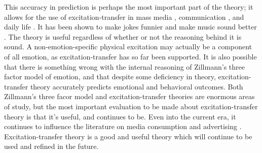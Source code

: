 \documentclass[
  stu,
  12pt]{apa7}
\begin{document}
This accuracy in prediction is perhaps the most important part of the
theory; it allows for the use of excitation-transfer in mass media
\autocite{bryExcitationTransferTheoryThreeFactor,tanEmotionalArousalFacilitation},
communication \autocite{zilEffectResidualExcitation}, and daily life
\autocite{tanEmotionalArousalFacilitation}. It has been shown to make
jokes funnier \autocite{canEnhancementHumorAppreciation} and make music
sound better \autocite{canEffectAffectiveState}. The theory is useful
regardless of whether or not the reasoning behind it is sound. A
non-emotion-specific physical excitation may actually be a component of
all emotion, as excitation-transfer has so far been supported. It is
also possible that there is something wrong with the internal reasoning
of Zillmann's three factor model of emotion, and that despite some
deficiency in theory, excitation-transfer theory accurately predicts
emotional and behavioral outcomes. Both Zillmann's three facor model and
excitation-transfer theories are enormous areas of study, but the most
important evaluation to be made about excitation-transfer theory is that
it's useful, and continues to be. Even into the current era, it
continues to influence the literature on media consumption and
advertising
\autocite{cumExcitationTransferEffects,bruAdvertisingActionEffect}.
Excitation-transfer theory is a good and useful theory which will
continue to be used and refined in the future.

\printbibliography
\end{document}
